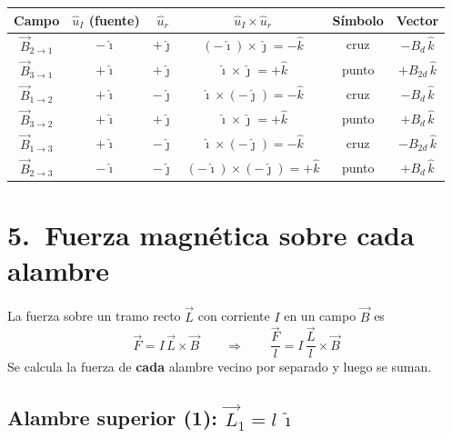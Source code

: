 \documentclass[12pt,letterpaper]{article}
\begin{document}
\begin{center}
\renewcommand{\arraystretch}{1.45}
\begin{tabular}{|c|c|c|c|c|c|}
\hline
\textbf{Campo} & $\hat{u}_I$ (fuente) & $\hat{u}_r$ & $\hat{u}_I\times\hat{u}_r$ & \textbf{S\'imbolo} & \textbf{Vector} \\
\hline
$\vec{B}_{2\to1}$ & $-\hat{\imath}$ & $+\hat{\jmath}$ & $(-\hat{\imath})\times\hat{\jmath} = -\hat{k}$
    & cruz  & $-B_d\,\hat{k}$ \\
$\vec{B}_{3\to1}$ & $+\hat{\imath}$ & $+\hat{\jmath}$ & $\hat{\imath}\times\hat{\jmath} = +\hat{k}$
    & punto & $+B_{2d}\,\hat{k}$ \\
\hline
$\vec{B}_{1\to2}$ & $+\hat{\imath}$ & $-\hat{\jmath}$ & $\hat{\imath}\times(-\hat{\jmath}) = -\hat{k}$
    & cruz  & $-B_d\,\hat{k}$ \\
$\vec{B}_{3\to2}$ & $+\hat{\imath}$ & $+\hat{\jmath}$ & $\hat{\imath}\times\hat{\jmath} = +\hat{k}$
    & punto & $+B_d\,\hat{k}$ \\
\hline
$\vec{B}_{1\to3}$ & $+\hat{\imath}$ & $-\hat{\jmath}$ & $\hat{\imath}\times(-\hat{\jmath}) = -\hat{k}$
    & cruz  & $-B_{2d}\,\hat{k}$ \\
$\vec{B}_{2\to3}$ & $-\hat{\imath}$ & $-\hat{\jmath}$ & $(-\hat{\imath})\times(-\hat{\jmath}) = +\hat{k}$
    & punto & $+B_d\,\hat{k}$ \\
\hline
\end{tabular}
\end{center}

\section*{5.\ Fuerza magn\'etica sobre cada alambre}

\noindent La fuerza sobre un tramo recto $\vec{L}$ con corriente $I$ en un campo $\vec{B}$ es
\[
    \vec{F} = I\,\vec{L}\times\vec{B}
    \qquad\Longrightarrow\qquad
    \frac{\vec{F}}{l} = I\,\frac{\vec{L}}{l}\times\vec{B}
\]
Se calcula la fuerza de \textbf{cada} alambre vecino por separado y luego se suman.

\subsection*{Alambre superior (1):\; $\vec{L}_1 = l\,\hat{\imath}$}
\end{document}
